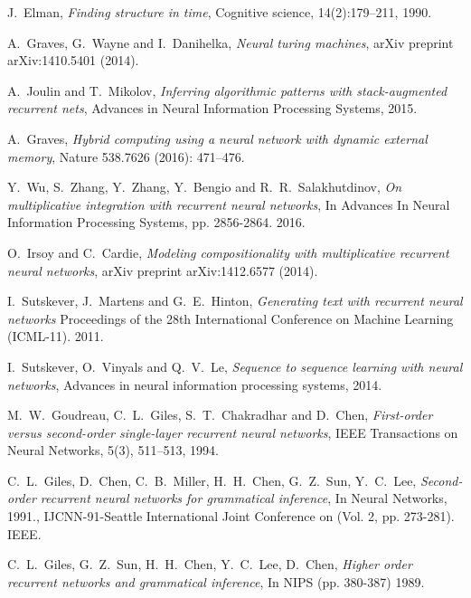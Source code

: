 \documentclass[english,letter paper,12pt,leqno]{article}
\theoremstyle{example}
\numberwithin{equation}{section}
\begin{document}

\providecommand{\bysame}{\leavevmode\hbox to3em{\hrulefill}\thinspace}
\providecommand{\href}[2]{#2}
\begin{thebibliography}{BHLS03}

J.~Elman, \textsl{Finding structure in time}, Cognitive science, 14(2):179–211, 1990.

A.~Graves, G.~Wayne and I.~Danihelka, \textsl{Neural turing machines}, arXiv preprint arXiv:1410.5401 (2014).

A.~Joulin and T.~Mikolov, \textsl{Inferring algorithmic patterns with stack-augmented recurrent nets}, Advances in Neural Information Processing Systems, 2015.

A.~Graves, \textsl{Hybrid computing using a neural network with dynamic external memory}, Nature 538.7626 (2016): 471--476.

Y.~Wu, S.~Zhang, Y.~Zhang, Y.~Bengio and R.~R.~Salakhutdinov, \textsl{On multiplicative integration with recurrent neural networks}, In Advances In Neural Information Processing Systems, pp. 2856-2864. 2016.

O.~Irsoy and C.~Cardie, \textsl{Modeling compositionality with multiplicative recurrent neural networks}, arXiv preprint arXiv:1412.6577 (2014).

I.~Sutskever, J.~Martens and G.~E.~Hinton, \textsl{Generating text with recurrent neural networks} Proceedings of the 28th International Conference on Machine Learning (ICML-11). 2011.

I.~Sutskever, O.~Vinyals and Q.~V.~Le, \textsl{Sequence to sequence learning with neural networks}, Advances in neural information processing systems, 2014.

M.~W.~Goudreau, C.~L.~Giles, S.~T.~Chakradhar and D.~Chen, \textsl{First-order versus second-order single-layer recurrent neural networks}, IEEE Transactions on Neural Networks, 5(3), 511--513, 1994.

C.~L.~Giles, D.~Chen, C.~B.~Miller, H.~H.~Chen, G.~Z.~Sun, Y.~C.~Lee, \textsl{Second-order recurrent neural networks for grammatical inference}, In Neural Networks, 1991., IJCNN-91-Seattle International Joint Conference on (Vol. 2, pp. 273-281). IEEE.

C.~L.~Giles, G.~Z.~Sun, H.~H.~Chen, Y.~C.~Lee, D.~Chen, \textsl{Higher order recurrent networks and grammatical inference}, In NIPS (pp. 380-387) 1989.


\end{thebibliography}
\end{document}
